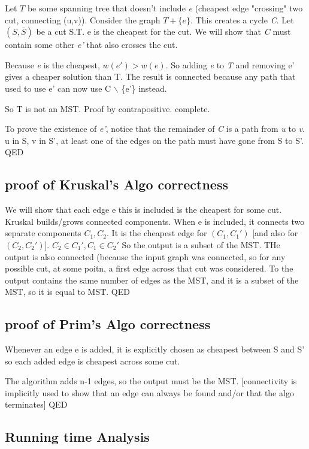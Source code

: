 \documentclass{article}
\begin{document}
Let $T$ be some spanning tree that doesn't include \textit{e}  (cheapest edge "crossing" two cut, connecting (u,v)). Consider the graph $T+\{e\}$. This creates a cycle \textit{C}. Let $(S, \bar{S})$ be a cut S.T. e is the cheapest for the cut. We will show that \textit{C} must contain some other \textit{e'} that also crosses the cut.

Because \textit{e} is the cheapest, $w(e') > w(e)$. So adding \textit{e} to \textit{T} and removing e' gives a cheaper solution than T. The result is connected because any path that used to use e' can now use C $\backslash$ \{e'\} instead.

So T is not an MST. Proof by contrapositive. complete.

To prove the existence of \textit{e'}, notice that the remainder of \textit{C} is a path from \textit{u} to \textit{v}.  u in S, v in S', at least one of the edges on the path must have gone from S to S'. QED

\subsection{proof of Kruskal's Algo correctness}
We will show that each edge e this is included is the cheapest for some cut.
Kruskal builds/grows connected components. When e is included, it connects two separate components $C_1, C_2$. It is the cheapest edge for $(C_1, C_1')$ [and also for $(C_2, C_2')$]. $C_2 \in C_1', C_1 \in C_2'$ So the output is a subset of the MST. THe output is also connected (because the input graph was connected, so for any possible cut, at some poitn, a first edge across that cut was considered. To the output contains the same number of edges as the MST, and it is a subset of the MST, so it is equal to MST. QED

\subsection{proof of Prim's Algo correctness}
Whenever an edge e is added, it is explicitly chosen as cheapest between S and S' so each added edge is cheapest across some cut.

The algorithm adds n-1 edges, so the output must be the MST. [connectivity is implicitly used to show that an edge can always be found and/or that the algo terminates] QED


\subsection{Running time Analysis}
\end{document}
